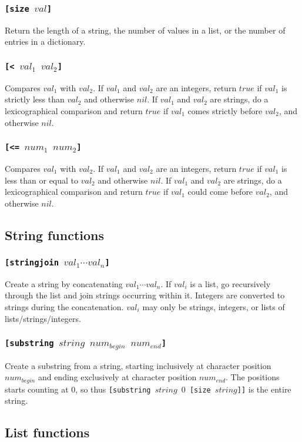\subsubsection{\tt{[size }$val$\tt{]}}
Return the length of a string, the number of values in a list, or the number of entries in a dictionary.
\subsubsection{\tt{[< }$val_1$ $val_2$\tt{]}}
Compares $val_1$ with $val_2$. If $val_1$ and $val_2$ are an integers, return $true$ if $val_1$ is strictly less than $val_2$ and otherwise $nil$.
If $val_1$ and $val_2$ are strings, do a lexicographical comparison and return $true$ if $val_1$ comes strictly before $val_2$, and otherwise $nil$.
\subsubsection{\tt{[<= }$num_1$ $num_2$\tt{]}}
Compares $val_1$ with $val_2$. If $val_1$ and $val_2$ are an integers, return $true$ if $val_1$ is less than or equal to $val_2$ and otherwise $nil$.
If $val_1$ and $val_2$ are strings, do a lexicographical comparison and return $true$ if $val_1$ could come before $val_2$, and otherwise $nil$.

\subsection{String functions}
\subsubsection{\tt{[stringjoin }$val_1\cdots val_n$\tt{]}}
Create a string by concatenating $val_1\cdots val_n$.
If $val_i$ is a list, go recursively through the list and join strings occurring within it. Integers are converted to strings during the concatenation. $val_i$ may only be strings, integers, or lists of lists/strings/integers.
\subsubsection{\tt{[substring }$string$ $num_{begin}$ $num_{end}$\tt{]}}
Create a substring from a string, starting inclusively at character position $num_{begin}$ and ending exclusively at character position $num_{end}$. The positions starts counting at $0$, so thus {\tt{[substring }$string$ $0$ \tt{[size }$string$\tt{]]}} is the entire string.

\subsection{List functions}
